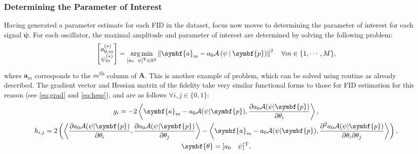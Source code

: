 \subsubsection{Determining the Parameter of Interest}
Having generated a parameter estimate for each \ac{FID} in the dataset, focus
now moves to determining the parameter of interest for each signal $\symbf{\psi}$.
For each oscillator, the maximal amplitude and parameter of
interest are determined by solving the following problem:
\begin{equation}
    \begin{bmatrix}
        a_{0,m}^{(*)} \\
        \psi_{m}^{(*)}
    \end{bmatrix} =
    \argmin_{
        [a_0 \hspace*{5pt} \psi]\T \in \mathbb{R}^2
    }
    \left\lVert
        \symbf{a}_m - a_0 \mathcal{A} \left(\psi \hspace*{2pt} | \hspace*{2pt} \symbf{p}\right)
    \right\rVert^2 \quad  \forall m \in \lbrace 1, \cdots, M \rbrace,
\end{equation}
where $\symbf{a}_m$ corresponds to the $m$\textsuperscript{th} column of
$\symbf{A}$.  This is another example of  problem, which can be solved using
 routine as already described. The gradient vector and Hessian matrix
of the fidelity take very similar functional forms to those for \ac{FID}
estimation for this reason (see \cref{eq:grad} and \cref{eq:hess}), and are as
follows $\forall
i, j \in \lbrace 0, 1 \rbrace$:
\begin{subequations}
    \begin{gather}
        g_i =
            -2 \left \langle
                \symbf{a}_m - a_0 \mathcal{A}(\psi | \symbf{p}),
                \frac{\partial a_0 \mathcal{A} (\psi | \symbf{p})}
                {\partial \theta_i}
            \right \rangle,\\
        h_{i,j} =
            2 \left( \left \langle
                \frac{\partial a_0 \mathcal{A} (\psi | \symbf{p})}{\partial \theta_i},
                \frac{\partial a_0 \mathcal{A} (\psi | \symbf{p})}{\partial \theta_j}
            \right \rangle -
            \left \langle
                \symbf{a}_m - a_0 \mathcal{A}(\psi | \symbf{p}),
                \frac{\partial^2 a_0 \mathcal{A} (\psi | \symbf{p})}{\partial
                \theta_i\partial \theta_j}
            \right \rangle \right), \\
            \symbf{\theta} = [a_0 \hspace*{10pt} \psi]\T,
    \end{gather}
\end{subequations}
